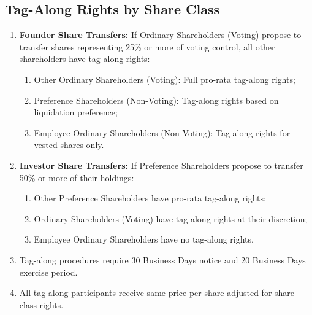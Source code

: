 \subsection{Tag-Along Rights by Share Class} \label{subsec:TagAlong}
\begin{enumerate}[label=(\alph*)]
\item \textbf{Founder Share Transfers:} If Ordinary Shareholders (Voting) propose to transfer shares representing 25\% or more of voting control, all other shareholders have tag-along rights:
    \begin{enumerate}[label=(\roman*)]
    \item Other Ordinary Shareholders (Voting): Full pro-rata tag-along rights;
    \item Preference Shareholders (Non-Voting): Tag-along rights based on liquidation preference;
    \item Employee Ordinary Shareholders (Non-Voting): Tag-along rights for vested shares only.
    \end{enumerate}
\item \textbf{Investor Share Transfers:} If Preference Shareholders propose to transfer 50\% or more of their holdings:
    \begin{enumerate}[label=(\roman*)]
    \item Other Preference Shareholders have pro-rata tag-along rights;
    \item Ordinary Shareholders (Voting) have tag-along rights at their discretion;
    \item Employee Ordinary Shareholders have no tag-along rights.
    \end{enumerate}
\item Tag-along procedures require 30 Business Days notice and 20 Business Days exercise period.
\item All tag-along participants receive same price per share adjusted for share class rights.
\end{enumerate}

